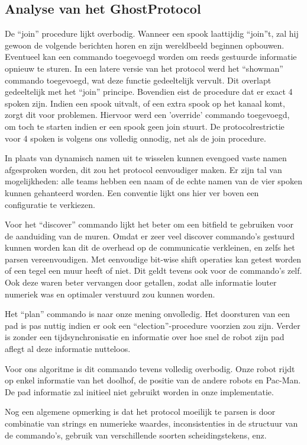 \documentclass[12pt,a4paper]{report}
\begin{document}
\subsection{Analyse van het GhostProtocol}

De ``join'' procedure lijkt overbodig. Wanneer een spook laattijdig ``join''t, zal hij gewoon de volgende berichten horen en zijn wereldbeeld beginnen opbouwen. Eventueel kan een commando toegevoegd worden om reeds gestuurde informatie opnieuw te sturen. In een latere versie van het protocol werd het ``showman'' commando toegevoegd, wat deze functie gedeeltelijk vervult. Dit overlapt gedeeltelijk met het ``join'' principe. Bovendien eist de procedure dat er exact 4 spoken zijn. Indien een spook uitvalt, of een extra spook op het kanaal komt, zorgt dit voor problemen. Hiervoor werd een 'override' commando toegevoegd, om toch te starten indien er een spook geen join stuurt. De protocolrestrictie voor 4 spoken is volgens ons volledig onnodig, net als de join procedure. 

In plaats van dynamisch namen uit te wisselen kunnen evengoed vaste namen afgesproken worden, dit zou het protocol eenvoudiger maken. Er zijn tal van mogelijkheden: alle teams hebben een naam of de echte namen van de vier spoken kunnen gehanteerd worden. Een conventie lijkt ons hier ver boven een configuratie te verkiezen.

Voor het ``discover'' commando lijkt het beter om een bitfield te gebruiken voor de aanduiding van de muren. Omdat er zeer veel discover commando's gestuurd kunnen worden kan dit de overhead op de communicatie verkleinen, en zelfs het parsen vereenvoudigen. Met eenvoudige bit-wise shift operaties kan getest worden of een tegel een muur heeft of niet. Dit geldt tevens ook voor de commando's zelf. Ook deze waren beter vervangen door getallen, zodat alle informatie louter numeriek was en optimaler verstuurd zou kunnen worden.

Het ``plan'' commando is naar onze mening onvolledig. Het doorsturen van een pad is pas nuttig indien er ook een ``election''-procedure voorzien zou zijn. Verder is zonder een tijdsynchronisatie en informatie over hoe snel de robot zijn pad aflegt al deze informatie nutteloos.

Voor ons algoritme is dit commando tevens volledig overbodig. Onze robot rijdt op enkel informatie van het doolhof, de positie van de andere robots en Pac-Man. De pad informatie zal initieel niet gebruikt worden in onze implementatie.

Nog een algemene opmerking is dat het protocol moeilijk te parsen is door combinatie van strings en numerieke waardes, inconsistenties in de structuur van de commando's, gebruik van verschillende soorten scheidingstekens, enz.
\end{document}
